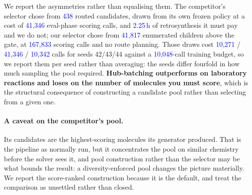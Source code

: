 \documentclass{article}
\newcommand{\checkval}[1]{\textcolor{blue}{#1}}
\begin{document}
We report the asymmetries rather than equalising them. The competitor's selector chose from
\checkval{438} routed candidates, drawn from its own frozen policy at a cost of
\checkval{41{,}346} eval-phase scoring calls, and \checkval{2.25\,h} of retrosynthesis it
must pay and we do not; our selector chose from \checkval{41{,}817} enumerated children
above the gate, at \checkval{167{,}833} scoring calls and no route planning. Those draws
cost \checkval{10{,}271} / \checkval{41{,}346} / \checkval{10{,}342} calls for seeds
42/43/44 against a \checkval{10{,}048}-call training budget, so we report them per seed
rather than averaging: the seeds differ fourfold in how much sampling the pool required.
\textbf{Hub-batching outperforms on laboratory reactions and loses on the number of
molecules you must score}, which is the structural consequence of constructing a candidate
pool rather than selecting from a given one.

\paragraph{A caveat on the competitor's pool.}
Its candidates are the highest-scoring molecules its generator produced. That is the
pipeline as normally run, but it concentrates the pool on similar chemistry before the
solver sees it, and pool construction rather than the selector may be what bounds the
result: a diversity-enforced pool changes the picture materially. We report the
score-ranked construction because it is the default, and treat the comparison as unsettled
rather than closed.
\end{document}
